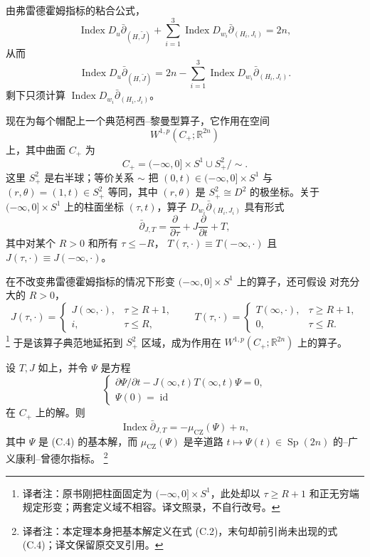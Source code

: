 由弗雷德霍姆指标的粘合公式，
\[
 \operatorname{Index}D_u\bar\partial_{(H,\widetilde J)}
 +\sum_{i=1}^3\operatorname{Index}D_{w_i}\bar\partial_{(H_i,J_i)}=2n,
\]
从而
\begin{equation}
\label{eq:app-c-gluing-index}
 \operatorname{Index}D_u\bar\partial_{(H,\widetilde J)}
 =2n-\sum_{i=1}^3\operatorname{Index}D_{w_i}\bar\partial_{(H_i,J_i)}.
\end{equation}
剩下只须计算 $\operatorname{Index}D_{w_i}\bar\partial_{(H_i,J_i)}$。

现在为每个帽配上一个典范柯西--黎曼型算子，它作用在空间
\[
 W^{1,p}(C_+;\mathbb R^{2n})
\]
上，其中曲面 $C_+$ 为
\[
 C_+=(-\infty,0]\times S^1\cup S_+^2/{\sim}.
\]
这里 $S_+^2$ 是右半球；等价关系 $\sim$ 把
$(0,t)\in(-\infty,0]\times S^1$ 与
$(r,\theta)=(1,t)\in S_+^2$ 等同，其中 $(r,\theta)$ 是
$S_+^2\cong D^2$ 的极坐标。关于 $(-\infty,0]\times S^1$ 上的柱面坐标
$(\tau,t)$，算子 $D_{w_i}\bar\partial_{(H_i,J_i)}$ 具有形式
\[
 \bar\partial_{J,T}=\frac\partial{\partial\tau}
 +J\frac\partial{\partial t}+T,
\]
其中对某个 $R>0$ 和所有 $\tau\leq-R$，
$T(\tau,\cdot)\equiv T(-\infty,\cdot)$ 且
$J(\tau,\cdot)\equiv J(-\infty,\cdot)$。

在不改变弗雷德霍姆指标的情况下形变 $(-\infty,0]\times S^1$ 上的算子，还可假设
对充分大的 $R>0$，
\[
 J(\tau,\cdot)=
 \begin{cases}
 J(\infty,\cdot),&\tau\geq R+1,\\
 i,&\tau\leq R,
 \end{cases}
 \qquad
 T(\tau,\cdot)=
 \begin{cases}
 T(\infty,\cdot),&\tau\geq R+1,\\
 0,&\tau\leq R.
 \end{cases}
\]
\footnote{译者注：原书刚把柱面固定为 $(-\infty,0]\times S^1$，此处却以
$\tau\geq R+1$ 和正无穷端规定形变；两套定义域不相容。译文照录，不自行改号。}
于是该算子典范地延拓到 $S_+^2$ 区域，成为作用在
$W^{1,p}(C_+;\mathbb R^{2n})$ 上的算子。

\begin{theorem}
\label{thm:app-c-cap-index}
设 $T,J$ 如上，并令 $\Psi$ 是方程
\begin{equation}
\label{eq:app-c-cap-fundamental-solution}
 \begin{cases}
 \partial\Psi/\partial t-J(\infty,t)T(\infty,t)\Psi=0,\\
 \Psi(0)=\operatorname{id}
 \end{cases}
\end{equation}
在 $C_+$ 上的解。则
\[
 \operatorname{Index}\bar\partial_{J,T}
 =-\mu_{\mathrm{CZ}}(\Psi)+n,
\]
其中 $\Psi$ 是 (C.4) 的基本解，而 $\mu_{\mathrm{CZ}}(\Psi)$ 是辛道路
$t\mapsto\Psi(t)\in\operatorname{Sp}(2n)$ 的\personRobbin{}--\personSalamon{}广义康利--曾德尔指标。
\footnote{译者注：本定理本身把基本解定义在式 (C.2)，末句却前引尚未出现的式
(C.4)；译文保留原交叉引用。}
\end{theorem}
